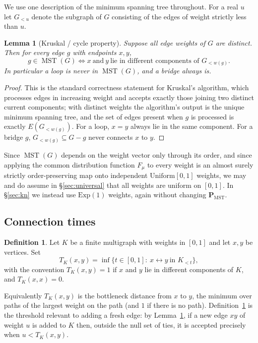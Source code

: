 \documentclass[11pt,a4paper]{amsart}
\theoremstyle{plain}
\newtheorem{lemma}[theorem]{Lemma}
\theoremstyle{definition}
\newtheorem{definition}[theorem]{Definition}
\theoremstyle{remark}
\newcommand{\MST}{\operatorname{MST}}
\newcommand{\PMST}{\mathbf{P}_{\mathrm{MST}}}
\begin{document}
We use one description of the minimum spanning tree throughout. For a real $u$
let $G_{<u}$ denote the subgraph of $G$ consisting of the edges of weight
strictly less than $u$.

\begin{lemma}[Kruskal / cycle property]
\label{lem:kruskal}
Suppose all edge weights of $G$ are distinct. Then for every edge $g$ with
endpoints $x,y$,
\[
g\in\MST(G)\iff x\ \text{and}\ y\ \text{lie in different components of }
G_{<w(g)} .
\]
In particular a loop is never in $\MST(G)$, and a bridge always is.
\end{lemma}

\begin{proof}
This is the standard correctness statement for Kruskal's algorithm, which
processes edges in increasing weight and accepts exactly those joining two
distinct current components; with distinct weights the algorithm's output is the
unique minimum spanning tree, and the set of edges present when $g$ is processed
is exactly $E(G_{<w(g)})$. For a loop, $x=y$ always lie in the same component.
For a bridge $g$, $G_{<w(g)}\subseteq G-g$ never connects $x$ to $y$.
\end{proof}

Since $\MST(G)$ depends on the weight vector only through its order, and since
applying the common distribution function $F_\mu$ to every weight is an
almost surely strictly order-preserving map onto independent
$\mathrm{Uniform}[0,1]$ weights, we may and do assume in \S\ref{sec:universal}
that all weights are uniform on $[0,1]$. In \S\ref{sec:kn} we instead use
$\mathrm{Exp}(1)$ weights, again without changing $\PMST$.

\subsection{Connection times}

\begin{definition}
\label{def:T}
Let $K$ be a finite multigraph with weights in $[0,1]$ and let $x,y$ be
vertices. Set
\[
T_K(x,y)=\inf\{t\in[0,1]:\ x\leftrightarrow y\ \text{in }K_{<t}\},
\]
with the convention $T_K(x,y)=1$ if $x$ and $y$ lie in different components of
$K$, and $T_K(x,x)=0$.
\end{definition}

Equivalently $T_K(x,y)$ is the bottleneck distance from $x$ to $y$, the minimum
over paths of the largest weight on the path (and $1$ if there is no path).
Definition~\ref{def:T} is the threshold relevant to adding a fresh edge: by
Lemma~\ref{lem:kruskal}, if a new edge $xy$ of weight $u$ is added to $K$ then,
outside the null set of ties, it is accepted precisely when $u<T_K(x,y)$.
\end{document}
